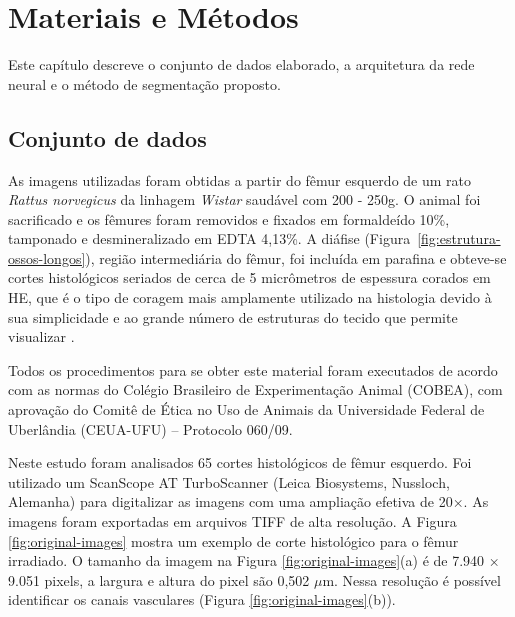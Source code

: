 \chapter[Materiais e Métodos]{Materiais e Métodos}
\label{materiais-e-metodos}

Este capítulo descreve o conjunto de dados elaborado, a arquitetura da rede neural e o método de segmentação proposto.

\section{Conjunto de dados}

As imagens utilizadas foram obtidas a partir do fêmur esquerdo de um rato \textit{Rattus norvegicus} da linhagem \textit{Wistar} saudável com 200 - 250g. O animal foi sacrificado e os fêmures foram removidos e fixados em formaldeído 10\%, tamponado e desmineralizado em EDTA 4,13\%. A diáfise (Figura~\ref{fig:estrutura-ossos-longos}), região intermediária do fêmur, foi incluída em parafina e obteve-se cortes histológicos seriados de cerca de 5 micrômetros de espessura corados em \ac{HE}, que é o tipo de coragem mais amplamente utilizado na histologia devido à sua simplicidade e ao grande número de estruturas do tecido que permite visualizar \cite{feldman2014tissue}. 

Todos os procedimentos para se obter este material foram executados de acordo com as normas do Colégio Brasileiro de Experimentação Animal (COBEA), com aprovação do Comitê de Ética no Uso de Animais da Universidade Federal de Uberlândia (CEUA-UFU) -- Protocolo 060/09.

Neste estudo foram analisados 65 cortes histológicos de fêmur esquerdo. Foi utilizado um ScanScope AT Turbo\textregistered Scanner (Leica Biosystems, Nussloch, Alemanha) para digitalizar as imagens com uma ampliação efetiva de 20×. As imagens foram exportadas em arquivos TIFF de alta resolução. A Figura \ref{fig:original-images} mostra um exemplo de corte histológico para o fêmur irradiado. O tamanho da imagem na Figura \ref{fig:original-images}(a) é de 7.940 × 9.051 pixels, a largura e altura do pixel são 0,502 \(\mu\)m. Nessa resolução é possível identificar os canais vasculares (Figura \ref{fig:original-images}(b)).

